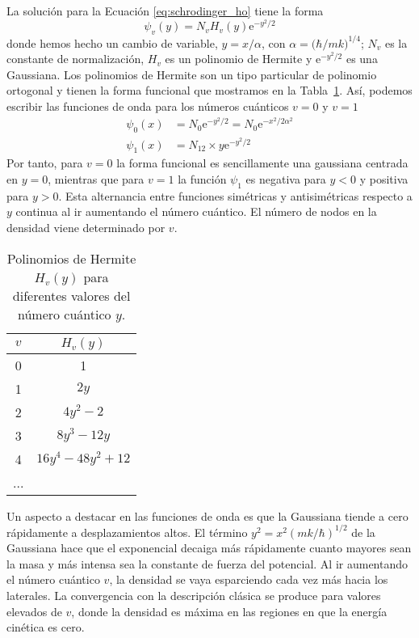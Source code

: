 La solución para la Ecuación \ref{eq:schrodinger_ho} 
tiene la forma
\begin{equation}
    \psi_v(y)=N_vH_v(y)\mathrm{e}^{-y^2/2}
\end{equation}
donde hemos hecho un cambio de variable, $y=x/\alpha$, 
con $\alpha=\big(\hbar/mk\big)^{1/4}$; $N_v$ es
la constante de normalización, $H_v$ es un polinomio de
Hermite y $\mathrm{e}^{-y^2/2}$ es una Gaussiana. 
Los polinomios de Hermite  son un tipo particular de
polinomio ortogonal y tienen la forma funcional que
mostramos en la Tabla~\ref{tb:hermite}. Así, podemos
escribir las funciones de onda para los números
cuánticos $v=0$ y $v=1$ 
\begin{subequations}
    \begin{align}
        \psi_0(x)&=N_0\mathrm{e}^{-y^2/2}=N_0\mathrm{e}^{-x^2/2\alpha^2} \\
        \psi_1(x)&=N_12\times y\mathrm{e}^{-y^2/2}
    \end{align}
\end{subequations}
Por tanto, para $v=0$ la forma funcional es sencillamente
una gaussiana centrada en $y=0$, mientras que para $v=1$ 
la función $\psi_1$ es negativa para $y<0$ y positiva para
$y>0$. Esta alternancia  entre funciones simétricas y
antisimétricas respecto a $y$ continua al ir aumentando el
número cuántico. El número de nodos en la densidad viene
determinado por $v$.

\begin{table}[t!]
    \centering
    \begin{tabular}{c|c}
     $v$ & $H_v(y)$ \\
     \hline
    0 & 1\\ 
    1 & $2y$\\ 
    2 & $4y^2-2$\\ 
    3 & $8y^3-12y$\\ 
    4 & $16y^4 - 48y^2 + 12$\\
    ... & 
    \end{tabular}
    \caption{Polinomios de Hermite $H_v(y)$ para diferentes 
    valores del número cuántico $y$.}
    \label{tb:hermite}
\end{table}

Un aspecto a destacar en las funciones de onda es que la
Gaussiana tiende a cero rápidamente a desplazamientos altos.
El término  $y^2=x^2(mk/\hbar)^{1/2}$ de la Gaussiana hace
que el exponencial decaiga más rápidamente cuanto mayores
sean la masa y más intensa sea la constante de fuerza del
potencial. Al ir aumentando el número cuántico $v$, la
densidad se vaya esparciendo cada vez más hacia los
laterales. %
La convergencia con la descripción clásica se produce para
valores elevados de $v$, donde la densidad es máxima en las
regiones en que la energía cinética es cero.